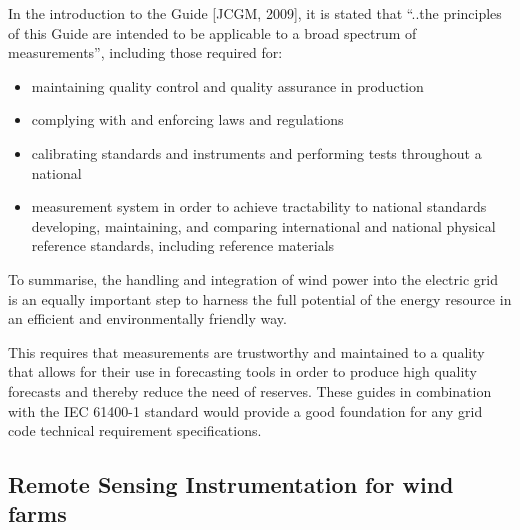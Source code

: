 In the introduction to the Guide [JCGM, 2009], it is stated that “..the principles of this Guide are intended to be applicable to a broad spectrum of measurements”, including those required for:
\begin{itemize}
   \item maintaining quality control and quality assurance in production
   \item complying with and enforcing laws and regulations
   \item calibrating standards and instruments and performing tests throughout a national 
   \item measurement system in order to achieve tractability to national standards developing, maintaining, and comparing international and national physical reference standards, including reference materials 
\end{itemize}

To summarise, the handling and integration of wind power into the electric grid is an equally important step to harness the full potential of the energy resource in an efficient and environmentally friendly way. 


This requires that measurements are trustworthy and maintained to a quality that allows for their use in forecasting tools in order to produce high quality forecasts and thereby reduce the need of reserves. These guides in combination with the IEC 61400-1 standard would provide a good foundation for any grid code technical requirement specifications. 
\fi 

\subsection{Remote Sensing Instrumentation for wind farms {\color{magenta}{Needs more shortening... }}{\color{blue}{authors: COM, IW}}}\label{sec:remote-sensing}



